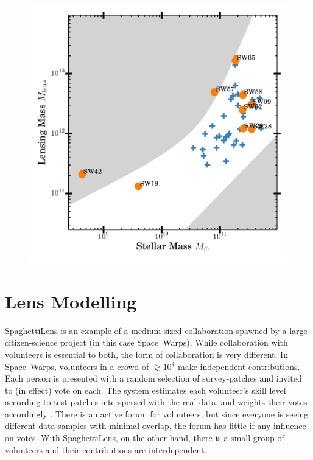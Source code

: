\documentclass[fleqn,usenatbib]{mnras}
\begin{document}
\begin{figure}
\caption{}
\end{figure}

\begin{figure}
\includegraphics[width=\linewidth]{img/mlens_vs_mstel_one/mstel_vs_mtot_one}
\caption{}
\end{figure}

\section{Lens Modelling}\label{sec:spl}

SpaghettiLens is an example of a medium-sized collaboration spawned by
a large citizen-science project (in this case Space~Warps).  While
collaboration with volunteers is essential to both, the form of
collaboration is very different.  In Space~Warps, volunteers in a
crowd of $\gtrsim10^4$ make independent contributions.  Each person is
presented with a random selection of survey-patches and invited to (in
effect) vote on each.  The system estimates each volunteer's skill
level according to test-patches interspersed with the real data, and
weights their votes accordingly \citep{2016MNRAS.455.1171M}.  There is
an active forum for volunteers, but since everyone is seeing different
data samples with minimal overlap, the forum has little if any
influence on votes.  With SpaghettiLens, on the other hand, there is a
small group of volunteers and their contributions are interdependent.
\end{document}
